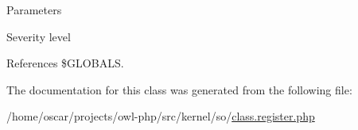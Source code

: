 \begin{DoxyParams}{Parameters}
\item[\mbox{\tt[in]} {\em \$severity\_\-level}]Severity level \end{DoxyParams}


References \$GLOBALS.



The documentation for this class was generated from the following file:\begin{DoxyCompactItemize}
\item 
/home/oscar/projects/owl-\/php/src/kernel/so/\hyperlink{class_8register_8php}{class.register.php}\end{DoxyCompactItemize}
